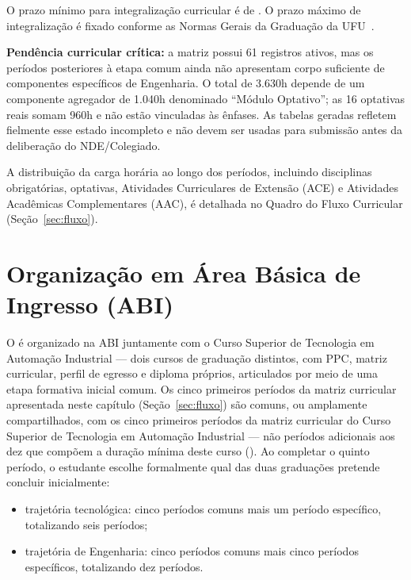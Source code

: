 O prazo mínimo para integralização curricular é de \textbf{\ppctempominimo}. O prazo máximo de integralização é fixado conforme as Normas Gerais da Graduação da UFU~\cite{ufu_congrad_46_2022}.

\textbf{Pendência curricular crítica:} a matriz possui 61 registros ativos, mas os períodos posteriores à etapa comum ainda não apresentam corpo suficiente de componentes específicos de Engenharia. O total de 3.630h depende de um componente agregador de 1.040h denominado ``Módulo Optativo''; as 16 optativas reais somam 960h e não estão vinculadas às ênfases. As tabelas geradas refletem fielmente esse estado incompleto e não devem ser usadas para submissão antes da deliberação do NDE/Colegiado.

A distribuição da carga horária ao longo dos períodos, incluindo disciplinas obrigatórias, optativas, Atividades Curriculares de Extensão (ACE) e Atividades Acadêmicas Complementares (AAC), é detalhada no Quadro do Fluxo Curricular (Seção~\ref{sec:fluxo}).

\section{Organização em Área Básica de Ingresso (ABI)}
\label{sec:abi_estrutura}

O \ppccurso é organizado na ABI juntamente com o Curso Superior de Tecnologia em Automação Industrial — dois cursos de graduação distintos, com PPC, matriz curricular, perfil de egresso e diploma próprios, articulados por meio de uma etapa formativa inicial comum. Os cinco primeiros períodos da matriz curricular apresentada neste capítulo (Seção~\ref{sec:fluxo}) são comuns, ou amplamente compartilhados, com os cinco primeiros períodos da matriz curricular do Curso Superior de Tecnologia em Automação Industrial — não períodos adicionais aos dez que compõem a duração mínima deste curso (\ppctempominimo). Ao completar o quinto período, o estudante escolhe formalmente qual das duas graduações pretende concluir inicialmente:

\begin{itemize}
    \item trajetória tecnológica: cinco períodos comuns mais um período específico, totalizando seis períodos;
    \item trajetória de Engenharia: cinco períodos comuns mais cinco períodos específicos, totalizando dez períodos.
\end{itemize}

